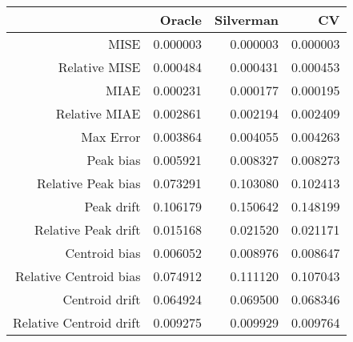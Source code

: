 \begin{tabular}{rrrr}
  \hline
 & Oracle & Silverman & CV \\ 
  \hline
MISE & 0.000003 & 0.000003 & 0.000003 \\ 
  Relative MISE & 0.000484 & 0.000431 & 0.000453 \\ 
  MIAE & 0.000231 & 0.000177 & 0.000195 \\ 
  Relative MIAE & 0.002861 & 0.002194 & 0.002409 \\ 
  Max Error & 0.003864 & 0.004055 & 0.004263 \\ 
  Peak bias & 0.005921 & 0.008327 & 0.008273 \\ 
  Relative Peak bias & 0.073291 & 0.103080 & 0.102413 \\ 
  Peak drift & 0.106179 & 0.150642 & 0.148199 \\ 
  Relative Peak drift & 0.015168 & 0.021520 & 0.021171 \\ 
  Centroid bias & 0.006052 & 0.008976 & 0.008647 \\ 
  Relative Centroid bias & 0.074912 & 0.111120 & 0.107043 \\ 
  Centroid drift & 0.064924 & 0.069500 & 0.068346 \\ 
  Relative Centroid drift & 0.009275 & 0.009929 & 0.009764 \\ 
   \hline
\end{tabular}
